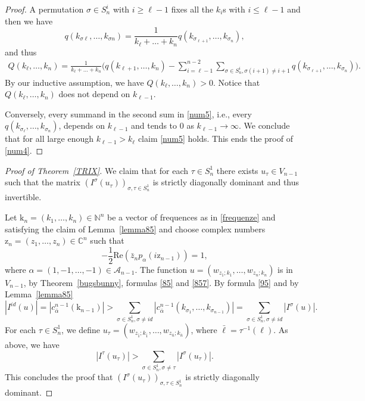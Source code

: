 \documentclass[12pt, reqno]{amsart}
\theoremstyle{plain}
\theoremstyle{definition}
\theoremstyle{remark}
\numberwithin{equation}{section}
\newcommand{\C}{\mathbb{C}}
\newcommand{\N}{\mathbb{N}}
\newcommand{\A}{\mathcal{A}}
\newcommand{\s}{\sigma}
\newcommand{\0}{\theta}
\renewcommand{\a}{\alpha}
\renewcommand{\k}{\kappa}
\newcommand{\z}{\zeta}
\newcommand{\1}{{-1}}
\renewcommand{\l}{\ell}
\renewcommand{\=}{\coloneqq}
\renewcommand{\.}{\dots}
\newcommand{\mc}{\mathcal}
\renewcommand{\A}{\mc A}
\renewcommand{\z}{\mathrm z}
\renewcommand{\k}{\mathrm k}
\renewcommand{\Re}{\mathrm {Re}}
\begin{document}
\begin{proof}
 A permutation $\s\in S_n^i$ with $i\geq \l-1$ fixes all the $k_i$s with $i\leq  \l-1$ and then we have
 \[
 q(k_{\s \l},\.,k_{\s n})=\frac{1}{k_\l+\.+k_n}  q(k_{\s_{\l+1}},\.,k_{\s _n}),
 \]
 and thus 
  \begin{align*}
    Q(k_\l,\dots,k_n)  =\frac{1}{k_\l+\.+k_n}\Big(q(k_{\l+1},\.,k_n)-\sum_{i=\l-1}^{n-2}\sum_{\s\in S_n^i, \s(i+1)\neq i+1}  q(k_{\s_{\l+1}},\.,k_{\s_ n})\Big).
 \end{align*}
 By our inductive assumption, 
we have  $  Q(k_\l,\dots,k_n)>0 $. 
 Notice that  $    Q(k_\l,\dots,k_n) $ does not depend on $k_{\l-1}$.
 
 Conversely, every summand in the second sum in \eqref{num5}, i.e., every $ q(k_{\s_ \l},\.,k_{\s _n})$,  depends on $k_{\l-1}$ 
 and tends to $0$ as $k_{\l-1}\to\infty$.
 We conclude that   for all large enough  $k_{\l-1}>k_\l$ claim \eqref{num5} holds. This ends the proof of   \eqref{num4}.
 
 




 
 
 
 \end{proof}
 
 
 
 
 \begin{proof}
 [Proof of Theorem~\ref{TRIX}]
  We claim that for each $\tau\in S_n^1$ there exists $u_\tau\in V_{n-1}$ such that
 the matrix $(I^\sigma(u_\tau))_{\s,\tau\in S_n^1}$ is strictly diagonally dominant and thus invertible.
 
 
 Let $\k_n=(k_1,\dots,k_n)\in  \N^n$ be a vector of frequences as in \eqref{frequenze} and satisfying the claim of Lemma~\ref{lemma85} and
   choose complex numbers $\z_n = (z_1,\dots,z_n)\in \C^n$ such that
 \[
 -\frac 12  \Re ( \bar z_n p_\a(i\z_{n-1}))=1,
 \]
 where $\a=(1,-1,\dots,-1)\in\A_{n-1}$.
The function $u=(w_{z_1;k_1},\dots, w_{z_n;k_n} )$ is in $V_{n-1}$, by Theorem~\ref{bugsbunny}, formulas \eqref{85} and \eqref{857}.
By formula \eqref{95} and by Lemma~\ref{lemma85}
\[
 | I^{{id}}(u) |= |c_{\bar \a}^{n-1}(\k_{n-1})|> \sum_{\s\in S_n^1,  \s\neq id}  | c_{\bar\a}^{n-1}( k_{\s _1},\dots, k_{\s_{n-1}} )|=
 \sum_{\s\in S_n^1,  \s\neq id}  | I^\s(u) |.
\]
For each $\tau \in S_n^1$, we define $u_\tau = (w_{z_{\bar 1};k_{\bar 1}},\dots, w_{z_{\bar n};k_{\bar n}} )$, where $\bar \l =\tau^{-1}(\l) $.
As above, we have
\[
 | I^{\tau}(u_\tau ) | > \sum_{\s\in S_n^1,  \s\neq \tau }   | I^\s(u_\tau) |.
\]
This concludes the proof that $(I^\sigma(u_\tau))_{\s,\tau\in S_n^1}$ is strictly diagonally dominant.

 \end{proof}  
  
\end{document}
